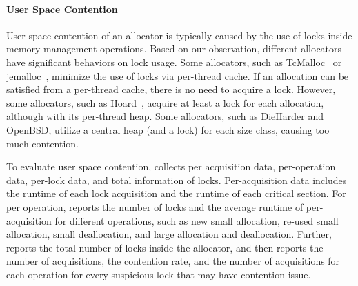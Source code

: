 \paragraph{User Space Contention} User space contention of an allocator is typically caused by the use of locks inside memory management operations. Based on our observation, different allocators have significant behaviors on lock usage. Some allocators, such as TcMalloc~\citep{tcmalloc} or jemalloc~\citep{jemalloc}, minimize the use of locks via per-thread cache. If an allocation can be satisfied from a per-thread cache, there is no need to acquire a lock. However, some allocators, such as Hoard~\citep{Hoard}, acquire at least a lock for each allocation, although with its per-thread heap. Some allocators, such as DieHarder and OpenBSD, utilize a central heap (and a lock) for each size class, causing too much contention. 


To evaluate user space contention, \MP{} collects per acquisition data, per-operation data, per-lock data, and total information of locks. Per-acquisition data includes the runtime of each lock acquisition and the runtime of each critical section. For per operation, \MP{} reports the number of locks and the average runtime of per-acquisition for different operations, such as new small allocation, re-used small allocation, small deallocation, and large allocation and deallocation.  Further, \MP{} reports the total number of locks inside the allocator, and then reports the number of acquisitions, the contention rate, and the number of acquisitions for each operation for every suspicious lock that may have contention issue. 
 
